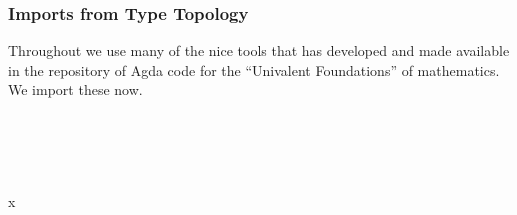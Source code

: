 \subsubsection{Imports from Type Topology}\label{imports-from-type-topology}
Throughout we use many of the nice tools that \mhe has developed and made available in the \TypeTopology repository of Agda code for the ``Univalent Foundations'' of mathematics. We import these now.
\ccpad
\begin{code}%
\>[0]\AgdaSpace{}%
\AgdaSpace{}%
\AgdaSpace{}%
\<%
\\
%
\\[\AgdaEmptyExtraSkip]%
\>[0]\AgdaSpace{}%
\AgdaSpace{}%
\AgdaSpace{}%
\AgdaSpace{}%
\AgdaSymbol{(}\AgdaSpace{}%
\AgdaSpace{}%
\AgdaSpace{}%
\AgdaSpace{}%
\AgdaSpace{}%
\AgdaSymbol{;}\AgdaSpace{}%
\AgdaSpace{}%
\AgdaSpace{}%
\AgdaSymbol{)}\AgdaSpace{}%
\<%
\\
%
\\[\AgdaEmptyExtraSkip]%
\>[0]\AgdaSpace{}%
\AgdaSpace{}%
\AgdaSpace{}%
\AgdaSymbol{=}\AgdaSpace{}%
\AgdaSpace{}%
\AgdaSymbol{\{}x \AgdaSymbol{=}\AgdaSpace{}%
\AgdaSymbol{\}}\<%
\\
%
\\[\AgdaEmptyExtraSkip]%
\>[0]\AgdaSpace{}%
\AgdaSpace{}%
\AgdaSpace{}%
\AgdaSpace{}%
\AgdaSymbol{(}\AgdaOperator{\AgdaInductiveConstructor{\AgdaUnderscore{},\AgdaUnderscore{}}}\AgdaSpace{}%
\AgdaSpace{}%
\AgdaSpace{}%
\AgdaSpace{}%
\AgdaOperator{\AgdaInductiveConstructor{\AgdaUnderscore{},\AgdaUnderscore{}}}\AgdaSymbol{)}\AgdaSpace{}%
\<%
\\
%
\\[\AgdaEmptyExtraSkip]%
\>[0]\AgdaSpace{}%
\AgdaSpace{}%
\AgdaSpace{}%
\AgdaSpace{}%
\AgdaSymbol{(}\AgdaSymbol{;}\AgdaSpace{}%

\end{code}
